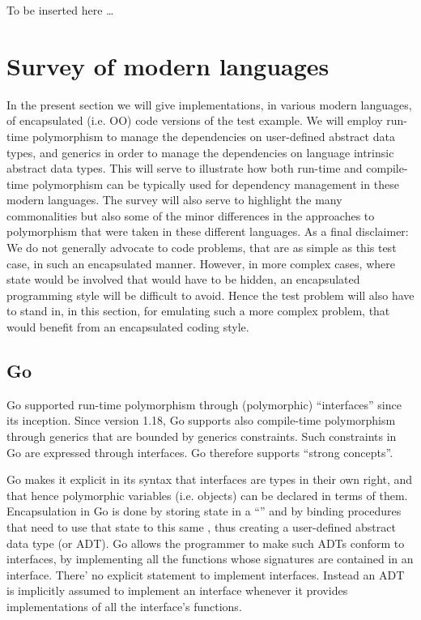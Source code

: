 \documentclass[11pt,oneside]{article}
\newcommand{\code}[1]{{\selectfont\ttfamily{#1}}}
\begin{document}
{\sf To be inserted here \dots}

\newpage

\section{Survey of modern languages}

In the present section we will give implementations, in various modern
languages, of encapsulated (i.e. OO) code versions of the test
example. We will employ run-time polymorphism to manage the
dependencies on user-defined abstract data types, and generics in
order to manage the dependencies on language intrinsic abstract data
types. This will serve to illustrate how both run-time and
compile-time polymorphism can be typically used for dependency
management in these modern languages. The survey will also serve to
highlight the many commonalities but also some of the minor
differences in the approaches to polymorphism that were taken in these
different languages. As a final disclaimer: We do not generally
advocate to code problems, that are as simple as this test case, in
such an encapsulated manner. However, in more complex cases, where
state would be involved that would have to be hidden, an encapsulated
programming style will be difficult to avoid. Hence the test problem
will also have to stand in, in this section, for emulating such a more
complex problem, that would benefit from an encapsulated coding style.


\subsection{Go}

Go supported run-time polymorphism through (polymorphic)
``interfaces'' since its inception. Since version 1.18, Go supports
also compile-time polymorphism through generics that are bounded by
generics constraints. Such constraints in Go are expressed through
interfaces. Go therefore supports ``strong concepts''.

Go makes it explicit in its syntax that interfaces are types in their
own right, and that hence polymorphic variables (i.e. objects) can be
declared in terms of them. Encapsulation in Go is done by storing
state in a ``\code{struct}'' and by binding procedures that need to
use that state to this same \code{struct}, thus creating a
user-defined abstract data type (or ADT). Go allows the programmer to
make such ADTs conform to interfaces, by implementing all the
functions whose signatures are contained in an interface. There' no
explicit statement to implement interfaces. Instead an ADT is
implicitly assumed to implement an interface whenever it provides
implementations of all the interface's functions.
\end{document}
